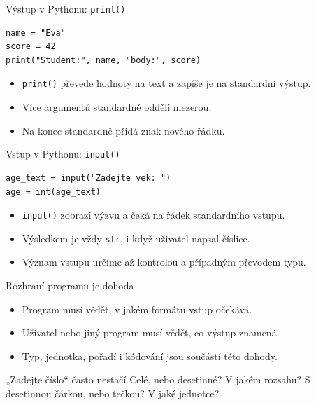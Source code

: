 \documentclass[aspectratio=169]{beamer}
\begin{document}
\begin{frame}[fragile]{Výstup v Pythonu: \texttt{print()}}
\begin{lstlisting}[style=python]
name = "Eva"
score = 42
print("Student:", name, "body:", score)
\end{lstlisting}
  \begin{itemize}
    \item \texttt{print()} převede hodnoty na text a zapíše je na standardní výstup.
    \item Více argumentů standardně oddělí mezerou.
    \item Na konec standardně přidá znak nového řádku.
  \end{itemize}
\end{frame}

\begin{frame}[fragile]{Vstup v Pythonu: \texttt{input()}}
\begin{lstlisting}[style=python]
age_text = input("Zadejte vek: ")
age = int(age_text)
\end{lstlisting}
  \begin{itemize}
    \item \texttt{input()} zobrazí výzvu a čeká na řádek standardního vstupu.
    \item Výsledkem je vždy \texttt{str}, i když uživatel napsal číslice.
    \item Význam vstupu určíme až kontrolou a případným převodem typu.
  \end{itemize}
\end{frame}

\begin{frame}{Rozhraní programu je dohoda}
  \begin{itemize}
    \item Program musí vědět, v jakém formátu vstup očekává.
    \item Uživatel nebo jiný program musí vědět, co výstup znamená.
    \item Typ, jednotka, pořadí i kódování jsou součástí této dohody.
  \end{itemize}
  \begin{alertblock}{„Zadejte číslo“ často nestačí}
    Celé, nebo desetinné? V jakém rozsahu? S desetinnou čárkou, nebo tečkou? V jaké jednotce?
  \end{alertblock}
\end{frame}
\end{document}

